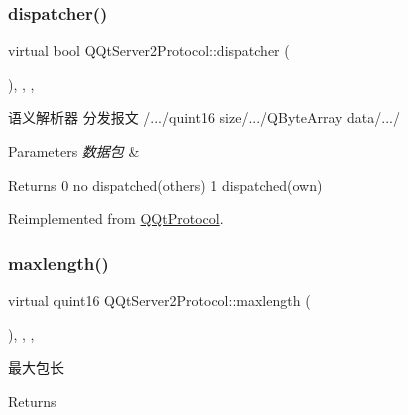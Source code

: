 \subsubsection{\texorpdfstring{dispatcher()}{dispatcher()}}
{\footnotesize\ttfamily virtual bool Q\+Qt\+Server2\+Protocol\+::dispatcher (\begin{DoxyParamCaption}\item[{const Q\+Byte\+Array \&}]{ }\end{DoxyParamCaption})\hspace{0.3cm}{\ttfamily [inline]}, {\ttfamily [override]}, {\ttfamily [protected]}, {\ttfamily [virtual]}}



语义解析器 分发报文 /.../quint16 size/.../\+Q\+Byte\+Array data/.../ 


\begin{DoxyParams}{Parameters}
{\em 数据包} & \\
\hline
\end{DoxyParams}
\begin{DoxyReturn}{Returns}
0 no dispatched(others) 1 dispatched(own) 
\end{DoxyReturn}


Reimplemented from \mbox{\hyperlink{class_q_qt_protocol_a35a69c4b89c8cf7459038f40d75e0dc9}{Q\+Qt\+Protocol}}.

\mbox{\label{class_q_qt_server2_protocol_a94d79a2cd8b22b353711fafe4dd8359b}} 
\subsubsection{\texorpdfstring{maxlength()}{maxlength()}}
{\footnotesize\ttfamily virtual quint16 Q\+Qt\+Server2\+Protocol\+::maxlength (\begin{DoxyParamCaption}{ }\end{DoxyParamCaption})\hspace{0.3cm}{\ttfamily [inline]}, {\ttfamily [override]}, {\ttfamily [protected]}, {\ttfamily [virtual]}}



最大包长 

\begin{DoxyReturn}{Returns}

\end{DoxyReturn}


